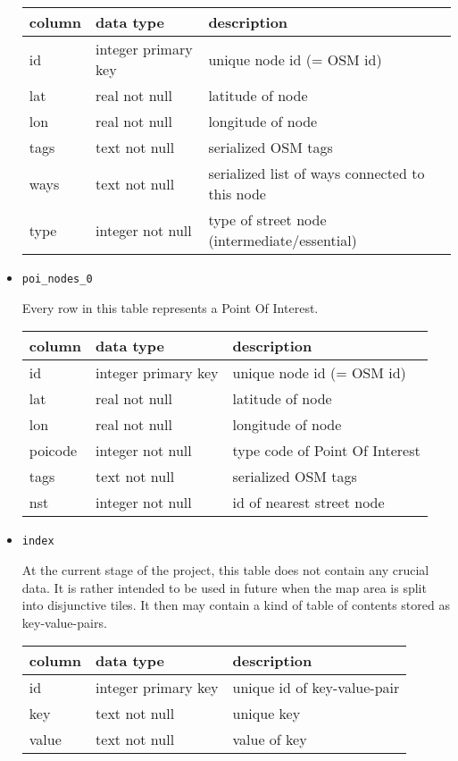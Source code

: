 \begin{itemize}
		\begin{tabular}[ht]{|p{2.5cm}|p{3.5cm}|p{8.5cm}|}
			\hline
			column & data type & description \\
			\hline\hline
			 id & integer primary key & unique node id (= OSM id)\\	
			 lat & real not null & latitude of node\\			 
			 lon & real not null & longitude of node\\	
			 tags & text not null & serialized OSM tags\\			 
			 ways & text not null & serialized list of ways connected to this node\\	
			 type & integer not null & type of street node (intermediate/essential)\\				 
			\hline
		\end{tabular}\newline
	
	\item \texttt{poi\_nodes\_0}

		Every row in this table represents a Point Of Interest.\newline
		
		\begin{tabular}[ht]{|p{2.5cm}|p{3.5cm}|p{8.5cm}|}
			\hline
			column & data type & description \\
			\hline\hline
			 id & integer primary key & unique node id (= OSM id)\\	
			 lat & real not null & latitude of node\\			 
			 lon & real not null & longitude of node\\
			 poicode & integer not null & type code of Point Of Interest\\	
			 tags & text not null & serialized OSM tags\\			 
			 nst & integer not null & id of nearest street node\\			 
			\hline
		\end{tabular}\newline
	
	\item \texttt{index}
	
		At the current stage of the project, this table does not contain any crucial data. It is rather intended to be used in future when the map area is split into disjunctive tiles. It then may contain a kind of table of contents stored as key-value-pairs.\newline
		
		\begin{tabular}[ht]{|p{2.5cm}|p{3.5cm}|p{8.5cm}|}
			\hline
			column & data type & description \\
			\hline\hline
			 id & integer primary key & unique id of key-value-pair\\	
			 key & text not null & unique key\\			 
			 value & text not null & value of key\\
			\hline
		\end{tabular}\newline
		
\end{itemize}

